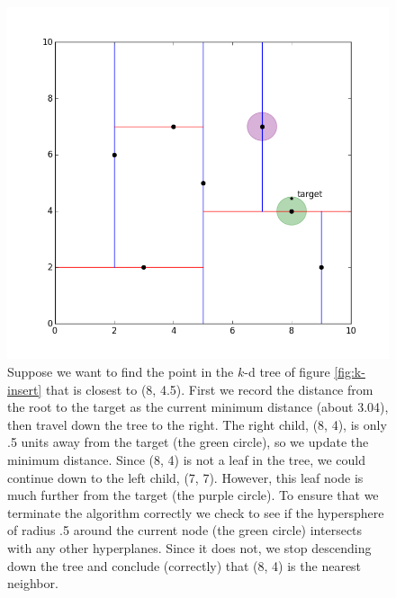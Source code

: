 \begin{figure}[H]
\includegraphics[width=\textwidth]{figures/kdpic3.png}
\caption{Suppose we want to find the point in the $k$-d tree of figure \ref{fig:k-insert} that is closest to (8, 4.5). First we record the distance from the root to the target as the current minimum distance (about 3.04), then travel down the tree to the right. The right child, (8, 4), is only .5 units away from the target (the green circle), so we update the minimum distance. Since (8, 4) is not a leaf in the tree, we could continue down to the left child, (7, 7). However, this leaf node is much further from the target (the purple circle). To ensure that we terminate the algorithm correctly we check to see if the hypersphere of radius .5 around the current node (the green circle) intersects with any other hyperplanes. Since it does not, we stop descending down the tree and conclude (correctly) that (8, 4) is the nearest neighbor.}
\label{fig:bad-search}
\end{figure}

